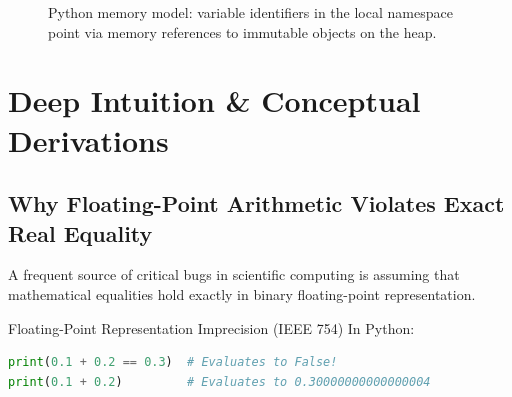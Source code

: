 \begin{figure}[htbp]
\caption{Python memory model: variable identifiers in the local namespace point via memory references to immutable objects on the heap.}
\label{fig:python_heap_references}
\end{figure}

\section{Deep Intuition \& Conceptual Derivations}

\subsection{Why Floating-Point Arithmetic Violates Exact Real Equality}

A frequent source of critical bugs in scientific computing is assuming that mathematical equalities hold exactly in binary floating-point representation.
\begin{theorembox}{Floating-Point Representation Imprecision (IEEE 754)}
In Python:
\begin{lstlisting}[language=Python]
print(0.1 + 0.2 == 0.3)  # Evaluates to False!
print(0.1 + 0.2)         # Evaluates to 0.30000000000000004
\end{lstlisting}
\end{theorembox}


